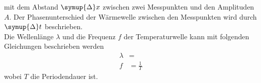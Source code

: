     mit dem Abstand $\symup{\Delta}x$ zwischen zwei Messpunkten und den Amplituden $A$. 
    Der Phasenunterschied der Wärmewelle zwischen den Messpunkten wird durch $\symup{\Delta} t$ beschrieben.\\
    Die Wellenlänge $\lambda$ und die Frequenz $f$ der Temperaturwelle kann mit folgenden Gleichungen
    beschrieben werden
    \begin{align}
        \lambda &= \\ %
        f &= \frac{1}{T} 
    \end{align}
    wobei $T$ die Periodendauer ist.
